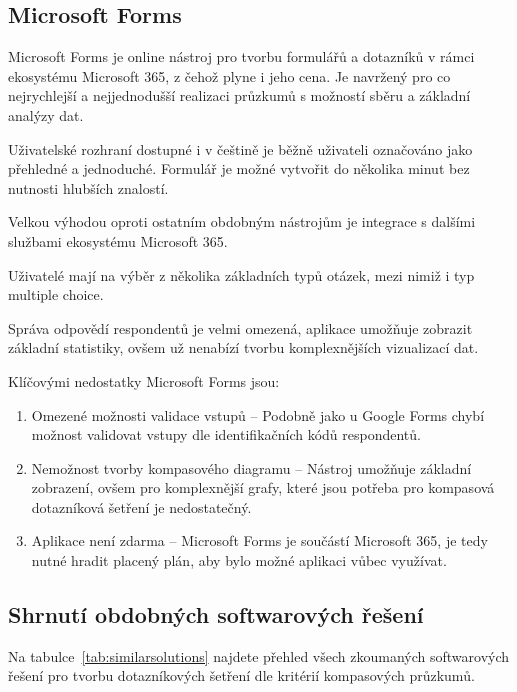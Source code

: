 \subsection{Microsoft Forms}
Microsoft Forms je online nástroj pro tvorbu formulářů a dotazníků v rámci ekosystému Microsoft 365, 
z čehož plyne i jeho cena. Je navržený pro co nejrychlejší a nejjednodušší realizaci průzkumů s možností 
sběru a základní analýzy dat. 

Uživatelské rozhraní dostupné i v češtině je běžně uživateli označováno jako přehledné a jednoduché. 
Formulář je možné vytvořit do několika minut bez nutnosti hlubších znalostí.

Velkou výhodou oproti ostatním obdobným nástrojům je integrace s dalšími službami ekosystému Microsoft 365.

Uživatelé mají na výběr z několika základních typů otázek, mezi nimiž i typ multiple choice.

Správa odpovědí respondentů je velmi omezená, aplikace umožňuje zobrazit základní statistiky, ovšem už nenabízí 
tvorbu komplexnějších vizualizací dat.~\cite{Microsof74:online}~\cite{Jotformv14:online}

Klíčovými nedostatky Microsoft Forms jsou:

\begin{enumerate}
    \item Omezené možnosti validace vstupů – Podobně jako u Google Forms chybí možnost validovat 
    vstupy dle identifikačních kódů respondentů.
    \item Nemožnost tvorby kompasového diagramu – Nástroj umožňuje základní zobrazení, ovšem pro 
    komplexnější grafy, které jsou potřeba pro kompasová dotazníková šetření je nedostatečný.
    \item Aplikace není zdarma – Microsoft Forms je součástí Microsoft 365, je tedy nutné hradit placený plán, 
    aby bylo možné aplikaci vůbec využívat.
\end{enumerate}

\subsection{Shrnutí obdobných softwarových řešení}
Na tabulce~\ref{tab:similarsolutions} najdete přehled všech zkoumaných softwarových řešení pro tvorbu
dotazníkových šetření dle kritérií kompasových průzkumů.

